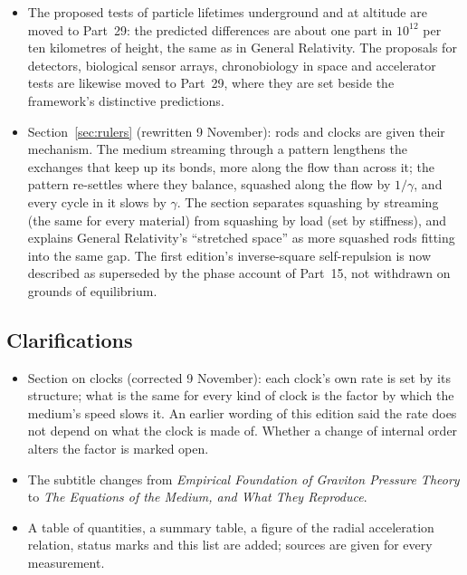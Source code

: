 \documentclass[11pt,a4paper]{article}
\begin{document}
\begin{itemize}
\item The proposed tests of particle lifetimes underground and at altitude are moved to Part~29: the predicted differences are about one part in $10^{12}$ per ten kilometres of height, the same as in General Relativity. The proposals for detectors, biological sensor arrays, chronobiology in space and accelerator tests are likewise moved to Part~29, where they are set beside the framework's distinctive predictions.
\item Section~\ref{sec:rulers} (rewritten 9 November): rods and clocks are given their mechanism. The medium streaming through a pattern lengthens the exchanges that keep up its bonds, more along the flow than across it; the pattern re-settles where they balance, squashed along the flow by $1/\gamma$, and every cycle in it slows by $\gamma$. The section separates squashing by streaming (the same for every material) from squashing by load (set by stiffness), and explains General Relativity's ``stretched space'' as more squashed rods fitting into the same gap. The first edition's inverse-square self-repulsion is now described as superseded by the phase account of Part~15, not withdrawn on grounds of equilibrium.
\end{itemize}

\subsection*{Clarifications}
\begin{itemize}
\item Section on clocks (corrected 9 November): each clock's own rate is set by its structure; what is the same for every kind of clock is the factor by which the medium's speed slows it. An earlier wording of this edition said the rate does not depend on what the clock is made of. Whether a change of internal order alters the factor is marked open.
\item The subtitle changes from \emph{Empirical Foundation of Graviton Pressure Theory} to \emph{The Equations of the Medium, and What They Reproduce}.
\item A table of quantities, a summary table, a figure of the radial acceleration relation, status marks and this list are added; sources are given for every measurement.
\end{itemize}

\newpage


\end{document}
